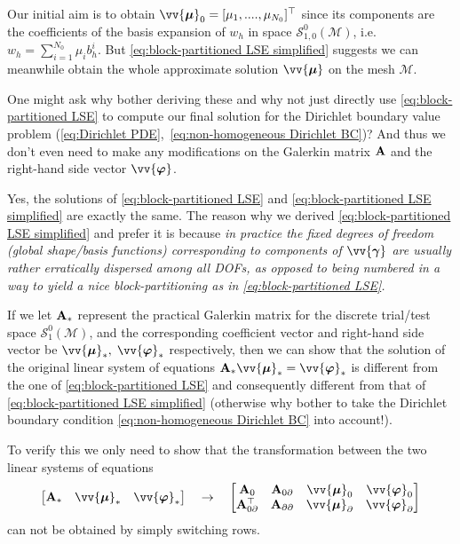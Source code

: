	Our initial aim is to obtain $\vv{\bm{\mu}}_0=[\mu_1,....,\mu_{N_0}]^\top$
	since its components are the coefficients of the basis expansion of $w_h$ 
	in space $\mathcal{S}_{1,0}^0(\mathcal{M})$, i.e. 
	$w_h=\sum_{i=1}^{N_0}\mu_i b_h^i$. But 
	\eqref{eq:block-partitioned LSE simplified} suggests we can meanwhile
	obtain the whole approximate solution $\vv{\bm{\mu}}$ on the mesh 
	$\mathcal{M}$. 
	
	One might ask why bother deriving these and why not just directly use 
	\eqref{eq:block-partitioned LSE} to compute our final solution for the
	Dirichlet boundary value problem 
	(\ref{eq:Dirichlet PDE},~\ref{eq:non-homogeneous Dirichlet BC})? And thus
	we don't even need to make any modifications on the Galerkin matrix $\mathbf{A}$ 
	and	the right-hand side vector $\vv{\bm{\varphi}}$.
	
	Yes, the solutions of \eqref{eq:block-partitioned LSE} and 
	\eqref{eq:block-partitioned LSE simplified} are exactly the same.
	The reason why we derived \eqref{eq:block-partitioned LSE simplified}
	and prefer it is because \emph{in practice the fixed degrees of freedom 
	(global shape/basis functions) corresponding to components of 
	$\vv{\bm{\gamma}}$ are usually rather erratically dispersed among all DOFs, 
	as opposed to being numbered in a way to yield a nice block-partitioning 
	as in \eqref{eq:block-partitioned LSE}.} 
	
	If we let $\mathbf{A}_*$ represent the practical Galerkin matrix for the discrete
	trial/test space $\mathcal{S}_1^0(\mathcal{M})$, and the corresponding 
	coefficient vector and right-hand side vector be $\vv{\bm{\mu}}_*,\;
	\vv{\bm{\varphi}}_*$ respectively, then we can show that the solution 
	of the original linear system of equations	
	$\bA_*\vv{\bm{\mu}}_*=\vv{\bm{\varphi}}_*$ is different from the one of 
	\eqref{eq:block-partitioned LSE} and consequently different from that of 
	\eqref{eq:block-partitioned LSE simplified} (otherwise why bother to take 
	the Dirichlet boundary condition \eqref{eq:non-homogeneous Dirichlet BC}
	into account!). 
	
	To verify this we only need to show that the transformation between the
	two linear systems of equations
	\[\begin{bmatrix}
		\bA_* & \vv{\bm{\mu}}_* & \vv{\bm{\varphi}}_*
	\end{bmatrix} \quad\rightarrow\quad 
	\begin{bmatrix}
		\bA_0 & \bA_{0\partial}& \vv{\bm{\mu}}_0 & \vv{\bm{\varphi}}_0\\
		\bA_{0\partial}^{\top} & \bA_{\partial\partial} 
		&\vv{\bm{\mu}}_\partial & \vv{\bm{\varphi}}_\partial
	\end{bmatrix} \]
	can not be obtained by simply switching rows.
	
